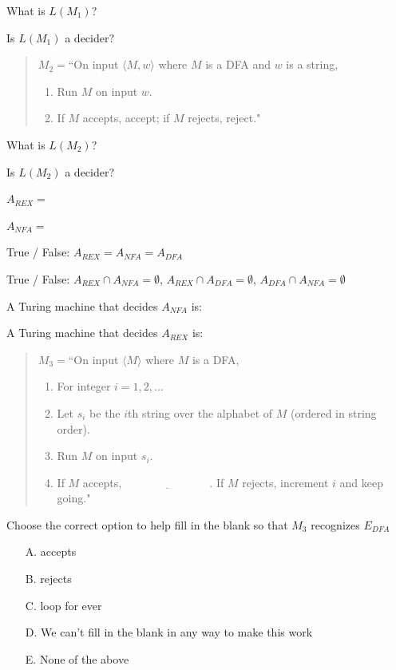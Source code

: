 \documentclass[12pt, oneside]{article}
\begin{document}
What is $L(M_1)$? 

\vfill

Is $L(M_1)$ a decider?

\vfill

  
  \begin{quote}
  $M_2 =  $``On  input  $\langle M, w \rangle$ where $M$ is a  DFA and  $w$ is  a string, 
  \begin{enumerate}
  \item Run $M$ on  input  $w$.
  \item If $M$  accepts, accept; if $M$ rejects, reject."
  \end{enumerate}
  \end{quote}
  

  What is $L(M_2)$? 

  \vfill
  
  Is $L(M_2)$ a decider?
  
  \vfill
  
    
\newpage
  $A_{REX} = $

  $A_{NFA} = $


  True / False: $A_{REX} = A_{NFA} = A_{DFA}$

  True / False: $A_{REX} \cap A_{NFA} = \emptyset$, $A_{REX} \cap A_{DFA} = \emptyset$, $A_{DFA} \cap A_{NFA} = \emptyset$

  
  A Turing machine that  decides $A_{NFA}$ is: 
  
  \vfill
  
  A Turing machine that  decides $A_{REX}$ is: 
  
  \vfill
  \newpage
  
  \begin{quote}
  $M_3 =  $``On  input  $\langle M\rangle$ where $M$ is a  DFA,
  \begin{enumerate}
  \item For integer  $i = 1, 2, \ldots$
  \item \qquad Let  $s_i$ be the  $i$th string over  the alphabet of  $M$ (ordered in  string order).
  \item \qquad Run $M$ on  input  $s_i$.
  \item \qquad If $M$  accepts,  $\underline{\phantom{FILL  IN BLANK}}$.  If $M$  rejects, increment $i$ and keep going."
  \end{enumerate}
  \end{quote}
  

Choose the correct option to help fill in the blank so that $M_3$ recognizes $E_{DFA}$
\begin{itemize}
\item[A.] accepts
\item[B.] rejects
\item[C.] loop for ever
\item[D.] We can't fill in the blank in any way to make this work
\item[E.] None of the above
\end{itemize}
\end{document}
